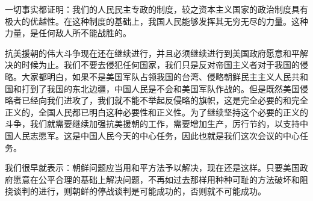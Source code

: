 一切事实都证明：我们的人民民主专政的制度，较之资本主义国家的政治制度具有极大的优越性。在这种制度的基础上，我国人民能够发挥其无穷无尽的力量。这种力量，是任何敌人所不能战胜的。

抗美援朝的伟大斗争现在还在继续进行，并且必须继续进行到美国政府愿意和平解决的时候为止。我们不要去侵犯任何国家，我们只是反对帝国主义者对于我国的侵略。大家都明白，如果不是美国军队占领我国的台湾、侵略朝鲜民主主义人民共和国和打到了我国的东北边疆，中国人民是不会和美国军队作战的。但是既然美国侵略者已经向我们进攻了，我们就不能不举起反侵略的旗帜，这是完全必要的和完全正义的，全国人民都已明白这种必要性和正义性。为了继续坚持这个必要的正义的斗争，我们就需要继续加强抗美援朝的工作，需要增加生产，厉行节约，以支持中国人民志愿军。这是中国人民今天的中心任务，因此也就是我们这次会议的中心任务。

我们很早就表示：朝鲜问题应当用和平方法予以解决，现在还是这样。只要美国政府愿意在公平合理的基础上解决问题，不再如过去那样用种种可耻的方法破坏和阻挠谈判的进行，则朝鲜的停战谈判是可能成功的，否则就不可能成功。

